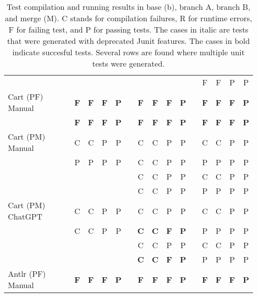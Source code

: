 \begin{table}[t]
\begin{tabular}{@{\extracolsep{\fill}} llcccccccccccccc}
                            & &   &   &   &   & &   &   &   &   & & F & F & P & P \\
Cart (PF) Manual            & & \textbf{F} & \textbf{F} & \textbf{F} & \textbf{P} & & \textbf{F} & \textbf{F} & \textbf{F} & \textbf{P} & & \textbf{F} & \textbf{F} & \textbf{F} & \textbf{P} \\
                            & & \textbf{F} & \textbf{F} & \textbf{F} & \textbf{P} & & \textbf{F} & \textbf{F} & \textbf{F} & \textbf{P} & & \textbf{F} & \textbf{F} & \textbf{F} & \textbf{P} \\
Cart (PM) Manual            & & C & C & P & P & & C & C & P & P & & C & C & P & P \\
                            & & P & P & P & P & & C & C & P & P & & P & P & P & P \\
                            & &   &   &   &   & & C & C & P & P & & C & C & P & P \\
                            & &   &   &   &   & & C & C & P & P & & P & P & P & P \\
Cart (PM) ChatGPT           & & C & C & P & P & & C & C & P & P & & C & C & P & P \\
                            & & C & C & P & P & & \textbf{C} & \textbf{C} & \textbf{F} & \textbf{P} & & P & P & P & P \\
                            & &   &   &   &   & & C & C & P & P & & C & C & P & P \\
                            & &   &   &   &   & & \textbf{C} & \textbf{C} & \textbf{F} & \textbf{P} & & P & P & P & P \\
Antlr (PF) Manual           & & \textbf{F} & \textbf{F} & \textbf{F} & \textbf{P} & & \textbf{F} & \textbf{F} & \textbf{F} & \textbf{P} & & \textbf{F} & \textbf{F} & \textbf{F} & \textbf{P} \\
        \bottomrule
    \end{tabular}
    \caption{Test compilation and running results in base (b), branch A,
    branch B, and merge (M).  C stands for compilation failures, R for runtime errors,
    F for failing test, and P for passing tests. The cases in italic are tests that were generated with deprecated Junit features.
    The cases in bold indicate succesful tests.
    Several rows are found where multiple unit tests were generated.
    \label{tab:results:rq2tests}}
\end{table}


